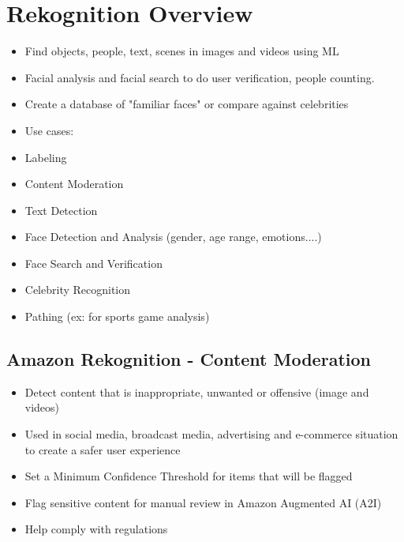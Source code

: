 \section{Rekognition Overview}
\begin{itemize}
    \item Find objects, people, text, scenes in images and videos using ML
    \item Facial analysis and facial search to do user verification, people counting.
    \item Create a database of "familiar faces" or compare against celebrities
    \item Use cases:
    \item Labeling
    \item Content Moderation
    \item Text Detection
    \item Face Detection and Analysis (gender, age range, emotions....)
    \item Face Search and Verification
    \item Celebrity Recognition
    \item Pathing (ex: for sports game analysis)
\end{itemize}

\subsection{Amazon Rekognition - Content Moderation}
\begin{itemize}
    \item Detect content that is inappropriate, unwanted or offensive (image and videos)
    \item Used in social media, broadcast media, advertising and e-commerce situation to create a safer user experience
    \item Set a Minimum Confidence Threshold for items that will be flagged
    \item Flag sensitive content for manual review in Amazon Augmented AI (A2I)
    \item Help comply with regulations
\end{itemize}


